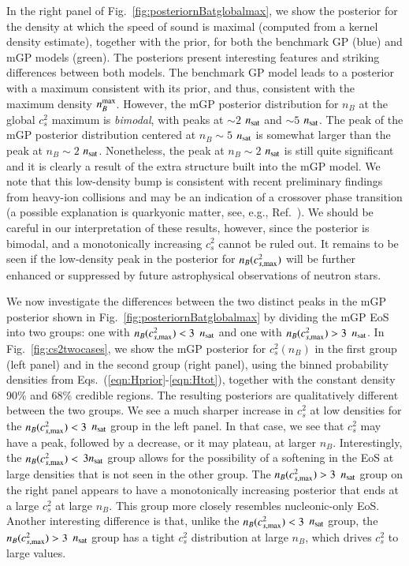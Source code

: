 \documentclass[aps,prd,nofootinbib,tightenlines,notitlepage,floatfix,superscriptaddress,showkeys,twocolumn]{revtex4-1}
\begin{document}
In the right panel of Fig.~\ref{fig:posteriornBatglobalmax}, we show the posterior for the density at which the speed of sound is maximal (computed from a kernel density estimate), together with the prior, for both the benchmark GP (blue) and mGP models (green). The posteriors present interesting features and  striking differences between both models. The benchmark GP model leads to a posterior with a maximum consistent with its prior, and thus, consistent with the maximum density $n_B^{\rm max}$. However, the mGP posterior distribution for $n_B$ at the global $c_s^2$ maximum is \textit{bimodal}, with peaks at $\sim 2$ $n_{\rm sat}$ and $\sim 5$ $n_{\rm sat}$. The peak of the mGP posterior distribution centered at $n_B\sim 5$ $n_{\rm sat}$ is somewhat larger than the peak at $n_B\sim 2$ $n_{\rm sat}$. Nonetheless, the peak at $n_B\sim 2$ $n_{\rm sat}$ is still quite significant and it is clearly a result of the extra structure built into the mGP model. We note that this low-density bump is consistent with recent preliminary findings from heavy-ion collisions \cite{Oliinychenko:2022uvy} and may be an indication of a crossover phase transition (a possible explanation is quarkyonic matter, see, e.g., Ref.~\cite{McLerran:2018hbz}). We should be careful in our interpretation of these results, however, since the posterior is bimodal, and a monotonically increasing $c_s^2$ cannot be ruled out. It remains to be seen if the low-density peak in the posterior for $n_B(c^2_{s,{\rm max}})$ will be further enhanced or suppressed by future astrophysical observations of neutron stars. 

We now investigate the differences between the two distinct peaks in the mGP posterior shown in Fig.~\ref{fig:posteriornBatglobalmax} by dividing the mGP EoS into two groups: one with $n_B(c^2_{s,{\rm max}})< 3$ $n_{\rm sat}$ and one with $n_B(c^2_{s,{\rm max}})>3$ $n_{\rm sat}$. In Fig.~\ref{fig:cs2twocases}, we show the mGP posterior for $c_s^2(n_B)$ in the first group (left panel) and in the second group (right panel), using the binned probability densities from Eqs.~(\ref{eqn:Hprior}-\ref{eqn:Htot}), together with the constant density 90\% and 68\% credible regions. The resulting posteriors are qualitatively different between the two groups. We see a much sharper increase in $c_s^2$ at low densities for the $n_B(c^2_{s,{\rm max}})<3$ $n_{\rm sat}$ group in the left panel. In that case, we see that $c_s^2$ may have a peak, followed by a decrease, or it may plateau, at larger $n_B$. Interestingly, the $n_B(c^2_{s,{\rm max}})<$ $3n_{\rm sat}$ group allows for the possibility of a softening in the EoS at large densities that is not seen in the other group. The $n_B(c^2_{s,{\rm max}})>3$ $n_{\rm sat}$ group on the right panel appears to have a monotonically increasing posterior that ends at a large $c_s^2$ at large $n_B$. This group more closely resembles nucleonic-only EoS.  Another interesting difference is that, unlike the $n_B(c^2_{s,{\rm max}})<3$ $n_{\rm sat}$ group, the $n_B(c^2_{s,{\rm max}})>3$ $n_{\rm sat}$ group has a tight $c_s^2$ distribution at large $n_B$, which drives $c_s^2$ to large values.
\end{document}
